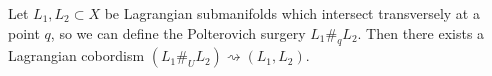 


    Let $L_1, L_2\subset X$ be Lagrangian submanifolds which intersect transversely at a point $q$, so we can define the Polterovich surgery $L_1\#_q L_2$. 
    Then there exists a Lagrangian cobordism $(L_1\#_U L_2)\rightsquigarrow (L_1, L_2)$. 
    \label{prop:traceconstruction}

